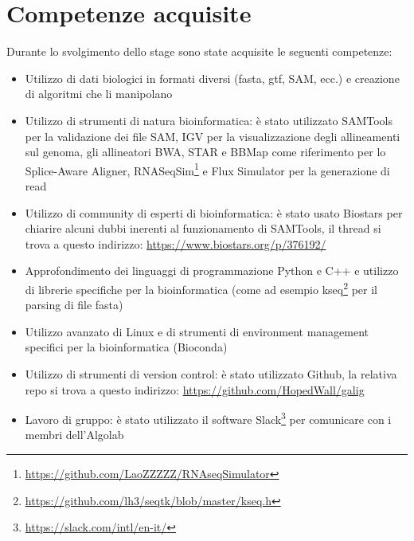 \section{Competenze acquisite}
Durante lo svolgimento dello stage sono state acquisite le seguenti competenze:

\begin{itemize}
	\item Utilizzo di dati biologici in formati diversi (fasta, gtf, SAM, ecc.) e creazione di algoritmi che li manipolano
	\item Utilizzo di strumenti di natura bioinformatica: è stato utilizzato SAMTools per la validazione dei file SAM, IGV per la visualizzazione degli allineamenti sul genoma, gli allineatori BWA, STAR e BBMap come riferimento per lo Splice-Aware Aligner, RNASeqSim\footnote{\url{https://github.com/LaoZZZZZ/RNAseqSimulator}} e Flux Simulator per la generazione di read
	\item Utilizzo di community di esperti di bioinformatica: è stato usato Biostars per chiarire alcuni dubbi inerenti al funzionamento di SAMTools, il thread si trova a questo indirizzo: \url{https://www.biostars.org/p/376192/}
	\item Approfondimento dei linguaggi di programmazione Python e C++ e utilizzo di librerie specifiche per la bioinformatica (come ad esempio kseq\footnote{\url{https://github.com/lh3/seqtk/blob/master/kseq.h}} per il parsing di file fasta)
	\item Utilizzo avanzato di Linux e di strumenti di environment management specifici per la bioinformatica (Bioconda)
	\item Utilizzo di strumenti di version control: è stato utilizzato Github, la relativa repo si trova a questo indirizzo: \url{https://github.com/HopedWall/galig}
	\item Lavoro di gruppo: è stato utilizzato il software Slack\footnote{\url{https://slack.com/intl/en-it/}} per comunicare con i membri dell'Algolab
\end{itemize}